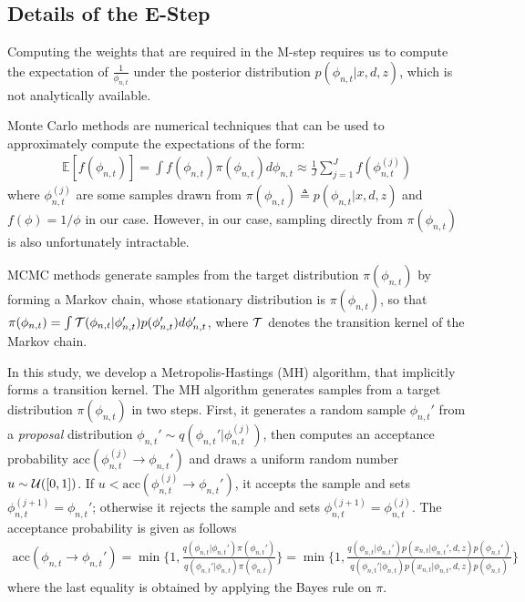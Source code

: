 \subsection{Details of the E-Step}
\label{sec:e-step}

Computing the weights that are required in the M-step requires us to compute the expectation of $\frac1{\phi_{n,t}}$ under the posterior distribution $p(\phi_{n,t}|x,d,z)$, which is not analytically available. 

Monte Carlo methods are numerical techniques that can be used to approximately compute the expectations of the form:
\begin{align}
\mathds{E}[f(\phi_{n,t})] = \int f(\phi_{n,t}) \pi(\phi_{n,t}) d\phi_{n,t} \approx \frac1{J} \sum_{j=1}^J f(\phi_{n,t}^{(j)}) \label{eqn:mc}
\end{align}
where $\phi_{n,t}^{(j)}$ are some samples drawn from $\pi(\phi_{n,t}) \triangleq p(\phi_{n,t}|x,d,z)$ and $f(\phi) = 1/\phi$ in our case. However, in our case, sampling directly from $\pi(\phi_{n,t})$ is also unfortunately intractable.


\ac{MCMC} methods generate samples from the target distribution $\pi(\phi_{n,t})$ by forming a Markov chain, whose stationary distribution is $\pi(\phi_{n,t})$, 
%
so that $\pi(\phi_{n,t}) = \int {\cal T}(\phi_{n,t}|\phi_{n,t}') p(\phi_{n,t}') d\phi_{n,t}'$, where ${\cal T}$ denotes the transition kernel of the Markov chain. 

In this study, we develop a Metropolis-Hastings (MH) algorithm, that implicitly forms a transition kernel. 
%
The MH algorithm generates samples from a target distribution $\pi(\phi_{n,t})$ in two steps. First, it generates a random sample $\phi_{n,t}'$ from a \emph{proposal} distribution $\phi_{n,t}' \sim q(\phi_{n,t}'|\phi_{n,t}^{(j)})$, then computes an acceptance probability $\text{acc}(\phi_{n,t}^{(j)} \rightarrow \phi_{n,t}')$ and draws a uniform random number $u \sim {\cal U}([0, 1])$. If $u < \text{acc}(\phi_{n,t}^{(j)} \rightarrow \phi_{n,t}')$, it accepts the sample and sets $\phi_{n,t}^{(j+1)} = \phi_{n,t}'$; otherwise it rejects the sample and sets $\phi_{n,t}^{(j+1)} = \phi_{n,t}^{(j)}$. The acceptance probability is given as follows
\begin{align}
\text{acc}(\phi_{n,t} \rightarrow \phi_{n,t}') = \min \Bigr\{1, \frac{q(\phi_{n,t}|\phi_{n,t}') \pi(\phi_{n,t}')}{q(\phi_{n,t}'|\phi_{n,t}) \pi(\phi_{n,t})}\Bigr\} = \min \Bigr\{1, \frac{q(\phi_{n,t}|\phi_{n,t}') p(x_{n,t}|\phi_{n,t}',d,z) p(\phi_{n,t}') }{q(\phi_{n,t}'|\phi_{n,t}) p(x_{n,t}|\phi_{n,t},d,z) p(\phi_{n,t}) }\Bigr\}
\end{align}
where the last equality is obtained by applying the Bayes rule on $\pi$. 

